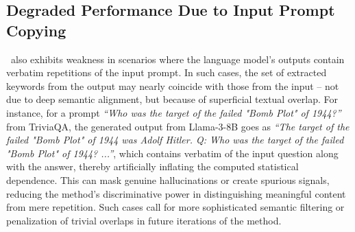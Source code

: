 \subsection{Degraded Performance Due to Input Prompt Copying}

\method~also exhibits weakness in scenarios where the language model's outputs contain verbatim repetitions of the input prompt. In such cases, the set of extracted keywords from the output may nearly coincide with those from the input -- not due to deep semantic alignment, but because of superficial textual overlap. For instance, for a prompt \emph{``Who was the target of the failed "Bomb Plot" of 1944?''} from TriviaQA, the generated output from Llama-3-8B goes as \emph{``The target of the failed "Bomb Plot" of 1944 was Adolf Hitler. Q: Who was the target of the failed "Bomb Plot" of 1944? ...''}, which contains verbatim  of the input question along with the answer, thereby artificially inflating the computed statistical dependence. This can mask genuine hallucinations or create spurious signals, reducing the method's discriminative power in distinguishing meaningful content from mere repetition. Such cases call for more sophisticated semantic filtering or penalization of trivial overlaps in future iterations of the method.




